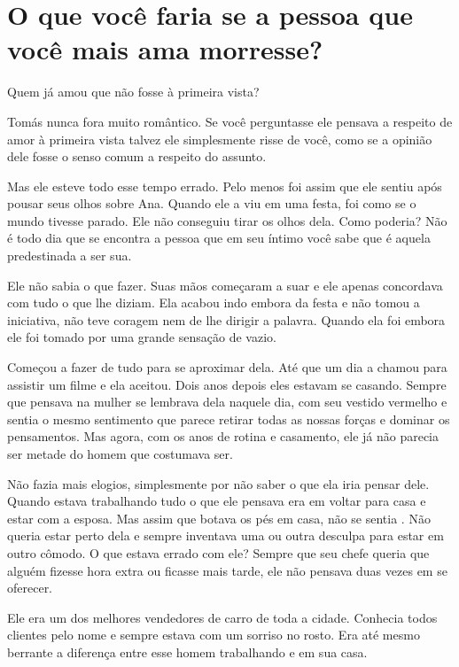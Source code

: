 \chapter{O que você faria se a pessoa que você mais ama morresse?}

Quem já amou que não fosse à primeira vista?

Tomás nunca fora muito romântico. Se você perguntasse  ele pensava a respeito de amor à primeira vista\mudanca{,} talvez ele simplesmente risse de você, como se a opinião dele fosse o senso comum a respeito do assunto.

Mas ele esteve todo esse tempo errado. Pelo menos foi assim que ele sentiu após pousar seus olhos sobre Ana. Quando ele a viu em uma festa, foi como se o mundo tivesse parado. Ele não conseguiu tirar os olhos dela. Como poderia? Não é todo dia que se encontra a pessoa que em seu íntimo você sabe que é aquela predestinada a ser sua.

Ele não sabia o que fazer. Suas mãos começaram a suar e ele apenas concordava com tudo o que lhe diziam. Ela acabou indo embora da festa e não tomou a iniciativa, não teve coragem nem de lhe dirigir a palavra. Quando ela foi embora ele foi tomado por uma grande sensação de vazio.

Começou a fazer de tudo para se aproximar dela. Até que um dia a chamou para assistir um filme e ela aceitou. Dois anos depois eles estavam se casando. Sempre que pensava na mulher se lembrava dela naquele dia, com seu vestido vermelho\mudanca{,} e sentia o mesmo sentimento que parece retirar todas as nossas forças e dominar os pensamentos. Mas agora, com os anos de rotina e casamento, ele já não parecia ser metade do homem que costumava ser.

Não fazia mais elogios, simplesmente por não saber o que ela iria pensar dele. Quando estava trabalhando\mudanca{,} tudo o que ele pensava era em voltar para casa e estar com a esposa. Mas assim que botava os pés em casa, não se sentia . Não queria estar perto dela e sempre inventava uma ou outra desculpa para estar em outro cômodo. O que estava errado com ele? Sempre que seu chefe queria que alguém fizesse hora extra ou ficasse mais tarde, ele não pensava duas vezes em se oferecer.

Ele era um dos melhores vendedores de carro de toda a cidade. Conhecia todos clientes pelo nome e sempre estava com um sorriso no rosto. Era até mesmo berrante a diferença entre esse homem trabalhando e em sua casa.

